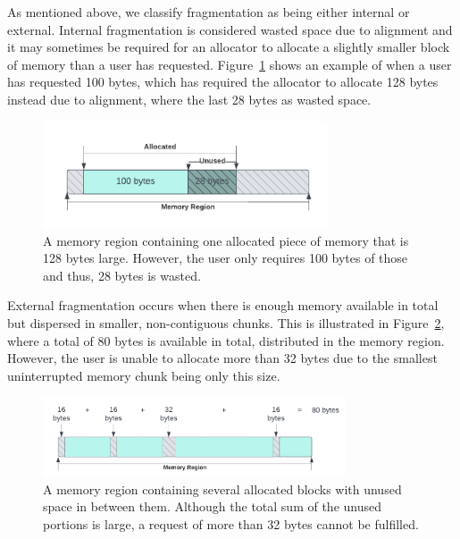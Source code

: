 
As mentioned above, we classify fragmentation as being either internal or external. Internal fragmentation is considered wasted space due to alignment and it may sometimes be required for an allocator to allocate a slightly smaller block of memory than a user has requested. Figure~\ref{fig:internal_fragmentation} shows an example of when a user has requested 100 bytes, which has required the allocator to allocate 128 bytes instead due to alignment, where the last 28 bytes as wasted space.

\begin{figure}[H]
    \centering
    \includegraphics[width=0.75\textwidth]{figures/internal_fragmentation.png}
    \caption{A memory region containing one allocated piece of memory that is 128 bytes large. However, the user only requires 100 bytes of those and thus, 28 bytes is wasted.}
    \label{fig:internal_fragmentation}
\end{figure}

External fragmentation occurs when there is enough memory available in total but dispersed in smaller, non-contiguous chunks. This is illustrated in Figure~\ref{fig:external_fragmentation}, where a total of 80 bytes is available in total, distributed in the memory region. However, the user is unable to allocate more than 32 bytes due to the smallest uninterrupted memory chunk being only this size.

\begin{figure}[H]
    \centering
    \includegraphics[width=0.8\textwidth]{figures/external_fragmentation.png}
    \caption{A memory region containing several allocated blocks with unused space in between them. Although the total sum of the unused portions is large, a request of more than 32 bytes cannot be fulfilled.}
    \label{fig:external_fragmentation}
\end{figure}



